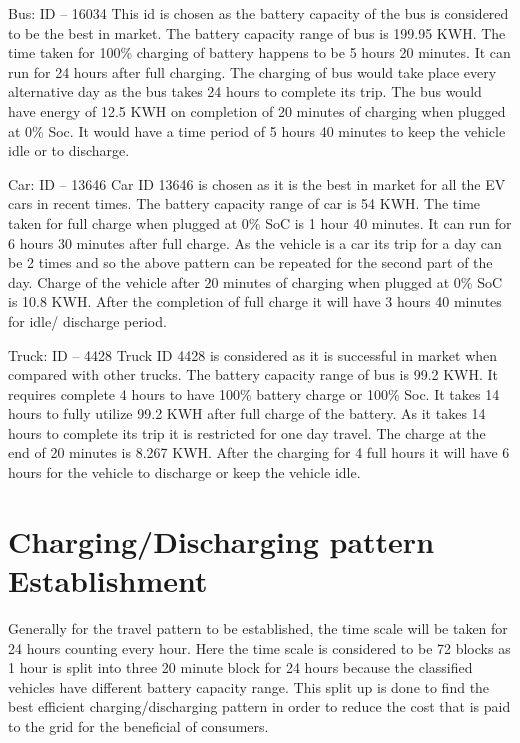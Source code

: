 	Bus: ID – 16034
	This id is chosen as the battery capacity of the bus is considered to be the best in market. The
	battery capacity range of bus is 199.95 KWH. The time taken for 100\% charging of battery
	happens to be 5 hours 20 minutes. It can run for 24 hours after full charging. The charging of
	bus would take place every alternative day as the bus takes 24 hours to complete its trip. The
	bus would have energy of 12.5 KWH on completion of 20 minutes of charging when plugged
	at 0\% Soc. It would have a time period of 5 hours 40 minutes to keep the vehicle idle or to
	discharge.
	
	Car: ID – 13646
	Car ID 13646 is chosen as it is the best in market for all the EV cars in recent times. The
	battery capacity range of car is 54 KWH. The time taken for full charge when plugged at 0\%
	SoC is 1 hour 40 minutes. It can run for 6 hours 30 minutes after full charge. As the vehicle is
	a car its trip for a day can be 2 times and so the above pattern can be repeated for the second
	part of the day. Charge of the vehicle after 20 minutes of charging when plugged at 0\% SoC
	is 10.8 KWH. After the completion of full charge it will have 3 hours 40 minutes for idle/
	discharge period.
	
	Truck: ID – 4428
	Truck ID 4428 is considered as it is successful in market when compared with other trucks.
	The battery capacity range of bus is 99.2 KWH. It requires complete 4 hours to have 100\%
	battery charge or 100\% Soc. It takes 14 hours to fully utilize 99.2 KWH after full charge of
	the battery. As it takes 14 hours to complete its trip it is restricted for one day travel. The
	charge at the end of 20 minutes is 8.267 KWH. After the charging for 4 full hours it will have
	6 hours for the vehicle to discharge or keep the vehicle idle.
	
	\section{Charging/Discharging pattern Establishment}
	
	Generally for the travel pattern to be established, the time scale will be taken for 24 hours
	counting every hour. Here the time scale is considered to be 72 blocks as 1 hour is split into
	three 20 minute block for 24 hours because the classified vehicles have different battery
	capacity range. This split up is done to find the best efficient charging/discharging pattern in
	order to reduce the cost that is paid to the grid for the beneficial of consumers.
	

